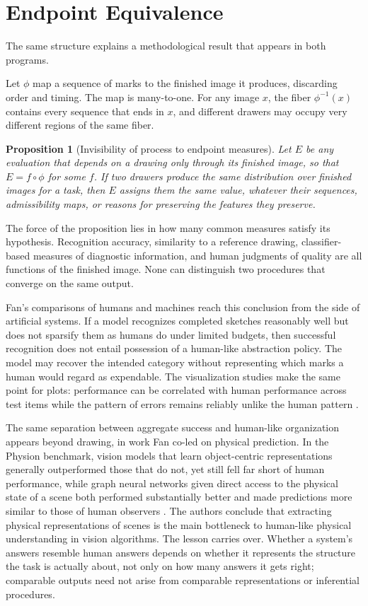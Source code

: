 \documentclass[11pt]{article}
\newtheorem{proposition}{Proposition}
\theoremstyle{remark}
\begin{document}
\section{Endpoint Equivalence}
\label{sec:endpoint}

The same structure explains a methodological result that appears in both programs.

Let $\phi$ map a sequence of marks to the finished image it produces, discarding order and timing. The map is many-to-one. For any image $x$, the fiber $\phi^{-1}(x)$ contains every sequence that ends in $x$, and different drawers may occupy very different regions of the same fiber.

\begin{proposition}[Invisibility of process to endpoint measures]
\label{prop:fiber}
Let $E$ be any evaluation that depends on a drawing only through its finished image, so that $E = f \circ \phi$ for some $f$. If two drawers produce the same distribution over finished images for a task, then $E$ assigns them the same value, whatever their sequences, admissibility maps, or reasons for preserving the features they preserve.
\end{proposition}

The force of the proposition lies in how many common measures satisfy its hypothesis. Recognition accuracy, similarity to a reference drawing, classifier-based measures of diagnostic information, and human judgments of quality are all functions of the finished image. None can distinguish two procedures that converge on the same output.

Fan's comparisons of humans and machines reach this conclusion from the side of artificial systems. If a model recognizes completed sketches reasonably well but does not sparsify them as humans do under limited budgets, then successful recognition does not entail possession of a human-like abstraction policy. The model may recover the intended category without representing which marks a human would regard as expendable. The visualization studies make the same point for plots: performance can be correlated with human performance across test items while the pattern of errors remains reliably unlike the human pattern \cite{verma2025}.

The same separation between aggregate success and human-like organization appears beyond drawing, in work Fan co-led on physical prediction. In the Physion benchmark, vision models that learn object-centric representations generally outperformed those that do not, yet still fell far short of human performance, while graph neural networks given direct access to the physical state of a scene both performed substantially better and made predictions more similar to those of human observers \cite{bear2021physion}. The authors conclude that extracting physical representations of scenes is the main bottleneck to human-like physical understanding in vision algorithms. The lesson carries over. Whether a system's answers resemble human answers depends on whether it represents the structure the task is actually about, not only on how many answers it gets right; comparable outputs need not arise from comparable representations or inferential procedures.
\end{document}
